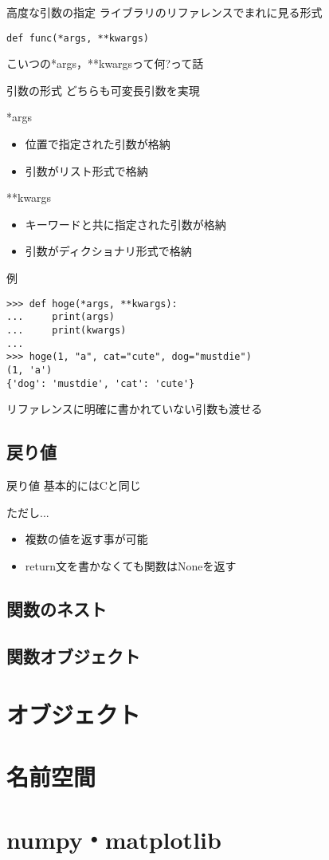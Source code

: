 \documentclass[12pt, xetex, xcolor=pdftex, dvipsnames]{beamer}
\begin{document}
\begin{frame}[fragile]{高度な引数の指定}
ライブラリのリファレンスでまれに見る形式

\begin{lstlisting}
def func(*args, **kwargs)
\end{lstlisting}

こいつの*args，**kwargsって何?って話
\end{frame}
\begin{frame}{引数の形式}
    どちらも\alert{可変長引数}を実現

    \begin{block}{*args}
        \begin{itemize}
            \item 位置で指定された引数が格納
            \item 引数がリスト形式で格納
        \end{itemize}
    \end{block}
    \begin{block}{**kwargs}
        \begin{itemize}
            \item キーワードと共に指定された引数が格納
            \item 引数がディクショナリ形式で格納
        \end{itemize}
    \end{block}
\end{frame}
\begin{frame}[fragile]{例}
\begin{lstlisting}
>>> def hoge(*args, **kwargs):
...     print(args)
...     print(kwargs)
...
>>> hoge(1, "a", cat="cute", dog="mustdie")
(1, 'a')
{'dog': 'mustdie', 'cat': 'cute'}
\end{lstlisting}
\pause

リファレンスに明確に書かれていない引数も渡せる
\end{frame}
\subsection{戻り値}
\begin{frame}{戻り値}
    基本的にはCと同じ

    ただし...
    \begin{itemize}
        \item 複数の値を返す事が可能
        \item return文を書かなくても関数はNoneを返す
    \end{itemize}
\end{frame}
\subsection{関数のネスト}
\subsection{関数オブジェクト}

\section{オブジェクト}

\section{名前空間}

\section{numpy・matplotlib}
\end{document}
